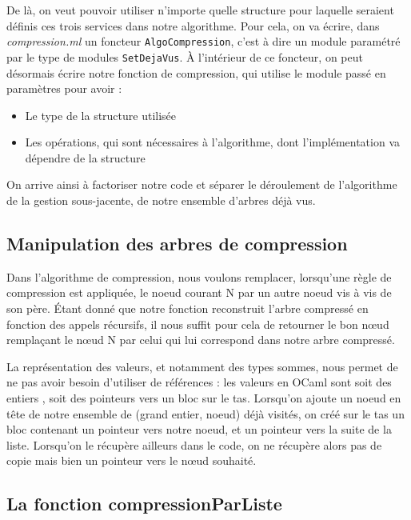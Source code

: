 \documentclass[12pt,a4paper]{article}
\begin{document}
De là, on veut pouvoir utiliser n'importe quelle structure pour laquelle seraient définis ces trois services dans notre algorithme. Pour cela, on va écrire, dans \textit{compression.ml} un foncteur \texttt{AlgoCompression}, c'est à dire un module paramétré par le type de modules \texttt{SetDejaVus}. À l'intérieur de ce foncteur, on peut désormais écrire notre fonction de compression, qui utilise le module passé en paramètres pour avoir :
\begin{itemize}
\item Le type de la structure utilisée
\item Les opérations, qui sont nécessaires à l'algorithme, dont l'implémentation va dépendre de la structure
\end{itemize}


On arrive ainsi à factoriser notre code et séparer le déroulement de l'algorithme de la gestion sous-jacente, de notre ensemble d'arbres déjà vus.






\subsection{Manipulation des arbres de compression}

Dans l'algorithme de compression, nous voulons remplacer, lorsqu'une règle de compression est appliquée, le noeud courant N par un autre noeud vis à vis de son père. Étant donné que notre fonction reconstruit l'arbre compressé en fonction des appels récursifs, il nous suffit pour cela de retourner le bon nœud remplaçant le nœud N par celui qui lui correspond dans notre arbre compressé.

La représentation des valeurs, et notamment des types sommes, nous permet de ne pas avoir besoin d'utiliser de références : les valeurs en OCaml sont soit des entiers , soit des pointeurs vers un bloc sur le tas. Lorsqu'on ajoute un noeud en tête de notre ensemble de (grand entier, noeud) déjà visités, on créé sur le tas un bloc contenant un pointeur vers notre noeud, et un pointeur vers la suite de la liste. Lorsqu'on le récupère ailleurs dans le code, on ne récupère alors pas de copie mais bien un pointeur vers le nœud souhaité. 


\subsection{La fonction compressionParListe}
\end{document}
